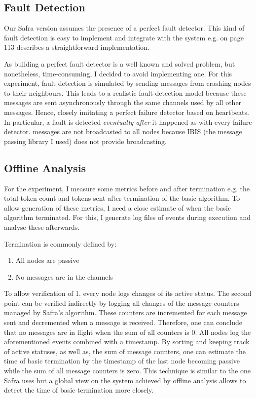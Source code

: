 \subsection{Fault Detection}
Our Safra version assumes the presence of a perfect fault detector.
This kind of fault detection is easy to implement and integrate with the system e.g.
\cite{Fokkink:2018} on page 113 describes a straightforward implementation.

As building a perfect fault detector is a well known and solved problem, but nonetheless, time-consuming, I decided to avoid implementing one.
For this experiment, fault detection is simulated by sending  messages from crashing nodes to their neighbours. 
This leads to a realistic fault detection model because these messages are sent asynchronously through the same channels used by all other messages. 
Hence, closely imitating a perfect failure detector based on heartbeats. 
In particular, a fault is detected \textit{eventually after} it happened as with every failure detector.
 messages are not broadcasted to all nodes because IBIS (the message passing library I used) does not provide broadcasting.  

\subsection{Offline Analysis}
\label{ssec:offline-analysis}
For the experiment, I measure some metrics before and after termination e.g. the total token count and tokens sent after termination of the basic algorithm.
To allow generation of these metrics, I need a close estimate of when the basic algorithm terminated.
For this, I generate log files of events during execution and analyse these afterwards.

Termination is commonly defined by:
\begin{enumerate}
	\item All nodes are passive
	\item No messages are in the channels
\end{enumerate}
To allow verification of 1. every node logs changes of its active status.
The second point can be verified indirectly by logging all changes of the message counters managed by Safra's algorithm.
These counters are incremented for each message sent and decremented when a message is received.
Therefore, one can conclude that no messages are in flight when the sum of all counters is 0.
All nodes log the aforementioned events combined with a timestamp.
By sorting and keeping track of active statuses, as well as, the sum of message counters, one can estimate the time of basic termination by the timestamp of the last node becoming passive while the sum of all message counters is zero.
This technique is similar to the one Safra uses but a global view on the system achieved by offline analysis allows to detect the time of basic termination more closely.

